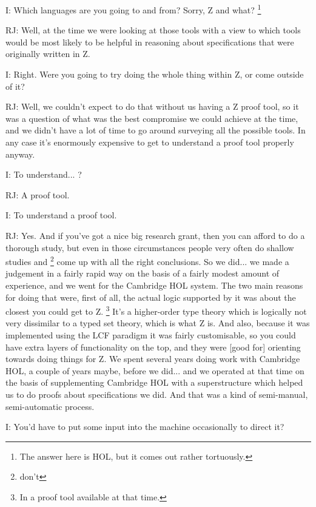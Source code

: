 \documentclass[10pt,titlepage]{book}
\begin{document}
I: Which languages are you going to and from?
Sorry, Z and what?%
\footnote{The answer here is HOL, but it comes out rather tortuously.}%

RJ: Well, at the time we were looking at those tools with a view to which tools would be most likely to be helpful in reasoning about specifications that were originally written in Z.

I: Right.
Were you going to try doing the whole thing within Z, or come outside of it?

RJ: Well, we couldn't expect to do that without us having a Z proof tool, so it was a question of what was the best compromise we could achieve at the time, and we didn't have a lot of time to go around surveying all the possible tools.
In any case it's enormously expensive to get to understand a proof tool properly anyway.

I: To understand... ?

RJ: A proof tool.

I: To understand a proof tool.

RJ: Yes.
And if you've got a nice big research grant, then you can afford to do a thorough study, but even in those circumstances people very often do shallow studies and \footnote{don't} come up with all the right conclusions.
So we did... we made a judgement in a fairly rapid way on the basis of a fairly modest amount of experience, and we went for the Cambridge HOL system.
The two main reasons for doing that were, first of all, the actual logic supported by it was about the closest you could get to Z.%
\footnote{In a proof tool available at that time.}%
It's a higher-order type theory which is logically not very dissimilar to a typed set theory, which is what Z is.
And also, because it was implemented using the LCF paradigm it was fairly customisable, so you could have extra layers of functionality on the top, and they were [good for] orienting towards doing things for Z.
We spent several years doing work with Cambridge HOL, a couple of years maybe, before we did... and we operated at that time on the basis of supplementing Cambridge HOL with a superstructure which helped us to do proofs about specifications we did. And that was a kind of semi-manual, semi-automatic process.

I: You'd have to put some input into the machine occasionally to direct it?
\end{document}
